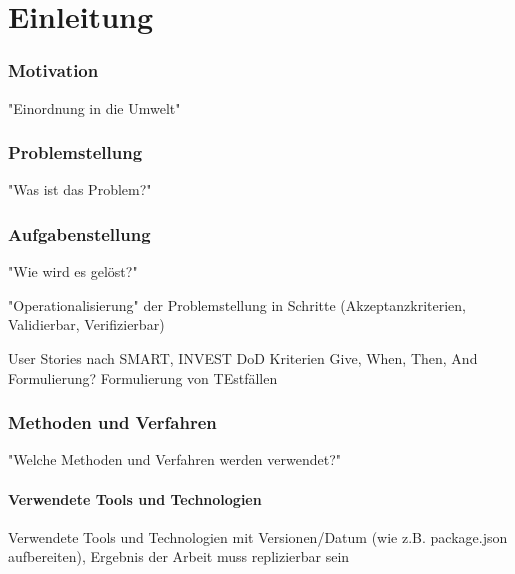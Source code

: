 \chapter{Einleitung}

\subsection{Motivation}
"Einordnung in die Umwelt"
\subsection{Problemstellung}
"Was ist das Problem?"
\subsection{Aufgabenstellung}
"Wie wird es gelöst?"

"Operationalisierung" der Problemstellung in Schritte (Akzeptanzkriterien, Validierbar, Verifizierbar)

User Stories nach
SMART, INVEST
DoD Kriterien
Give, When, Then, And Formulierung?
Formulierung von TEstfällen

\subsection{Methoden und Verfahren}
"Welche Methoden und Verfahren werden verwendet?"
\subsubsection{Verwendete Tools und Technologien}
Verwendete Tools und Technologien mit Versionen/Datum (wie z.B. package.json aufbereiten), Ergebnis der Arbeit muss replizierbar sein
